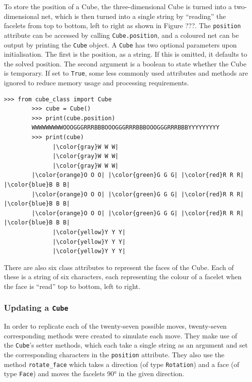 \documentclass{report}
\begin{document}
    To store the position of a Cube, the three-dimensional Cube is turned into a two-dimensional net, which is then turned into a single string by \enquote{reading} the facelets from top to bottom, left to right as shown in Figure ???. The \lstinline|position| attribute can be accessed by calling \lstinline|Cube.position|, and a coloured net can be output by printing the \lstinline|Cube| object. A \lstinline|Cube| has two optional parameters upon initialisation. The first is the position, as a string. If this is omitted, it defaults to the solved position. The second argument is a boolean to state whether the Cube is temporary. If set to \lstinline|True|, some less commonly used attributes and methods are ignored to reduce memory usage and processing requirements.
    
	\begin{lstlisting}[caption={The two different ways of accessing a Cube's position}]
		>>> from cube_class import Cube
		>>> cube = Cube()
		>>> print(cube.position)
		WWWWWWWWWOOOGGGRRRBBBOOOGGGRRRBBBOOOGGGRRRBBBYYYYYYYYY
		>>> print(cube)
	 	      |\color{gray}W W W|
	 	      |\color{gray}W W W|
	 	      |\color{gray}W W W|
        |\color{orange}O O O| |\color{green}G G G| |\color{red}R R R| |\color{blue}B B B|
        |\color{orange}O O O| |\color{green}G G G| |\color{red}R R R| |\color{blue}B B B|
        |\color{orange}O O O| |\color{green}G G G| |\color{red}R R R| |\color{blue}B B B|
	 	      |\color{yellow}Y Y Y|
	 	      |\color{yellow}Y Y Y|
	 	      |\color{yellow}Y Y Y|\end{lstlisting}
    
    There are also six class attributes to represent the faces of the Cube. Each of these is a string of six characters, each representing the colour of a facelet when the face is \enquote{read} top to bottom, left to right.
    
    \subsubsection{Updating a \lstinline|Cube|}
    
    In order to replicate each of the twenty-seven possible moves, twenty-seven corresponding methods were created to simulate each move. They make use of the \lstinline|Cube|'s setter methods, which each take a single string as an argument and set the corresponding characters in the \lstinline|position| attribute. They also use the method \lstinline|rotate_face| which takes a direction (of type \lstinline|Rotation|) and a face (of type \lstinline|Face|) and moves the facelets \ang{90} in the given direction.
    
\end{document}
